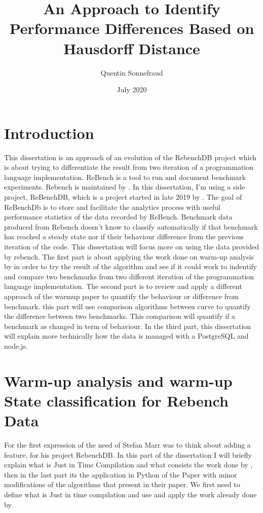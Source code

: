 \documentclass{article}
\title{An Approach to Identify Performance Differences Based on Hausdorff Distance}
\author{Quentin Sonnefraud}
\date{July 2020}
\begin{document}
\maketitle

\tableofcontents

\section{Introduction}

This dissertation is an approach of an evolution of the RebenchDB project which is about trying to differentiate the result from two iteration of a programmation language implementation. 
ReBench is a tool to run and document benchmark experiments. Rebench is maintained by \cite{ReBench:2018}. In this dissertation, I'm using a side project, ReBenchDB, which is a project started in late 2019 by \cite{ReBench:2018}. The goal of ReBenchDb is to store and facilitate the analytics process with useful performance statistics of the data recorded by ReBench. Benchmark data produced from Rebench doesn't know to classify automatically if that benchmark has reached a steady state nor if their behaviour difference from the previous iteration of the code. This dissertation will focus more on using the data provided by rebench. The first part is about applying the work done on warm-up analysis by \cite{barrett2017virtual} in order to try the result of the algorithm and see if it could work to indentify and compare two benchmarks from two different iteration of the programmation language implementation.
The second part is to review and apply a different approach of the warmup paper to quantify the behaviour or difference from benchmark. this part will use comparison algorithms between curve to quantify the difference between two benchmarks. This comparison will quantify if a benchmark as changed in term of behaviour. In the third part, this dissertation will explain more technically how the data is managed with a PostgreSQL and node.js.\\


\section{ Warm-up analysis and warm-up State classification for Rebench Data}

For the first expression of the need of Stefan Marr was to think about adding a feature, for his project RebenchDB. In this part of the dissertation I will briefly explain what is Just in Time Compilation and what consists the work done by \cite{barrett2017virtual}, then in the last part its the application in Python of the Paper with minor modifications of the algorithms that \cite{barrett2017virtual} present in their paper. We first need to define what is Just in time compilation and use and apply the work already done by \cite{barrett2017virtual}
\end{document}
